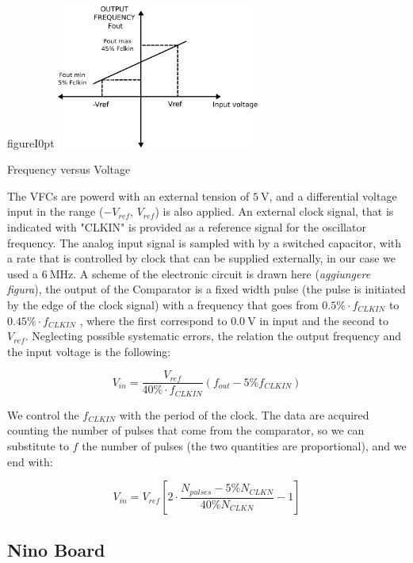 \begin{wrapfloat}{figure}{I}{0pt}
\includegraphics[width=0.5\textwidth]{ExperimentalSetup/Vfc.pdf}
\caption{Frequency versus Voltage}
\end{wrapfloat}

The VFCs are powerd with an external tension of $\SI{5}{\volt}$, and a differential voltage input in the range ($-V_{ref}$, $V_{ref}$) is also applied. An external clock signal, that is indicated with "CLKIN" is provided as a reference signal for the oscillator frequency.
The analog input signal is sampled with by a switched capacitor, with a rate that is controlled by clock that can be supplied externally, in our case we used a $\SI{6}{\mega \hertz}$. A scheme of the electronic circuit is drawn here (\textit{aggiungere figura}), the output of the Comparator  is a fixed width pulse (the pulse is initiated by the edge of the clock signal) with a frequency that goes from $0.5 \% \cdot f_{CLKIN}$ to $0.45 \% \cdot f_{CLKIN}$ \cite{VfcDatasheet}, where the first correspond to $\SI{0.0}{ \volt}$ in input and the second to $V_{ref}$. Neglecting possible systematic errors, the relation the output frequency and the input voltage is the following:

\begin{equation}
V_{in} = \frac{V_{ref}}{40 \% \cdot f_{CLKIN}} (f_{out} - 5\% f_{CLKIN})
\end{equation}

We control the $f_{CLKIN}$ with the period of the clock. The data are acquired counting the number of pulses that come from the comparator, so we can substitute to $f$ the number of pulses (the two quantities are proportional), and we end with:

\begin{equation} \label{eq:Vfc}
V_{in} =  V_{ref}[2 \cdot \dfrac{N_{pulses} - 5 \% N_{CLKN}}{40 \% N_{CLKN}} - 1]
\end{equation}

\subsection{Nino Board} \label{NINO}

